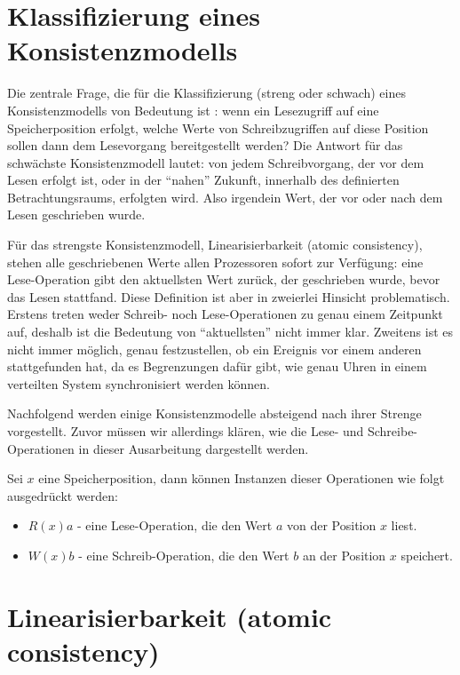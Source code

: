 \section{Klassifizierung eines Konsistenzmodells}

Die zentrale Frage, die für die Klassifizierung (streng oder schwach) eines Konsistenzmodells von Bedeutung ist \cite{Coulouris:02}: wenn ein Lesezugriff auf eine Speicherposition erfolgt, welche Werte von Schreibzugriffen auf diese Position sollen dann dem Lesevorgang bereitgestellt werden? Die Antwort für das schwächste Konsistenzmodell lautet: von jedem Schreibvorgang, der vor dem Lesen erfolgt ist, oder in der "`nahen"' Zukunft, innerhalb des definierten Betrachtungsraums, erfolgten wird. Also irgendein Wert, der vor oder nach dem Lesen geschrieben wurde.

Für das strengste Konsistenzmodell, Linearisierbarkeit (atomic consistency), stehen alle geschriebenen Werte allen Prozessoren sofort zur Verfügung: eine Lese-Operation gibt den aktuellsten Wert zurück, der geschrieben wurde, bevor das Lesen stattfand. Diese Definition ist aber in zweierlei Hinsicht problematisch. Erstens treten weder Schreib- noch Lese-Operationen zu genau einem Zeitpunkt auf, deshalb ist die Bedeutung von "`aktuellsten"' nicht immer klar. Zweitens ist es nicht immer möglich, genau festzustellen, ob ein Ereignis vor einem anderen stattgefunden hat, da es Begrenzungen dafür gibt, wie genau Uhren in einem verteilten System synchronisiert werden können.

Nachfolgend werden einige Konsistenzmodelle absteigend nach ihrer Strenge vorgestellt. Zuvor müssen wir allerdings klären, wie die Lese- und Schreibe-Operationen in dieser Ausarbeitung dargestellt werden.

Sei $x$ eine Speicherposition, dann können Instanzen dieser Operationen wie folgt ausgedrückt werden:

\begin{itemize}
	\item $R(x)a$ - eine Lese-Operation, die den Wert $a$ von der Position $x$ liest.
	\item $W(x)b$ - eine Schreib-Operation, die den Wert $b$ an der Position $x$ speichert.
\end{itemize}

\section{Linearisierbarkeit (atomic consistency)}

